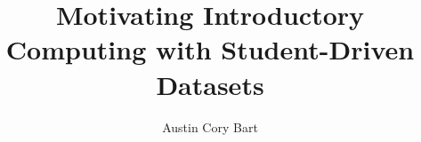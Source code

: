 \documentclass[12pt]{article}
\begin{document}

\title{Motivating Introductory Computing with Student-Driven Datasets} 
\author{Austin Cory Bart}
\maketitle     

\newpage
\tableofcontents
\pagebreak
\listoffigures

\newpage   

    
\newpage
{}
\pagestyle{myheadings}
\setcounter{page}{1}


\pagebreak









%

%

%

%

%

%




\begin{appendices}






%  
\end{appendices}
\end{document}
